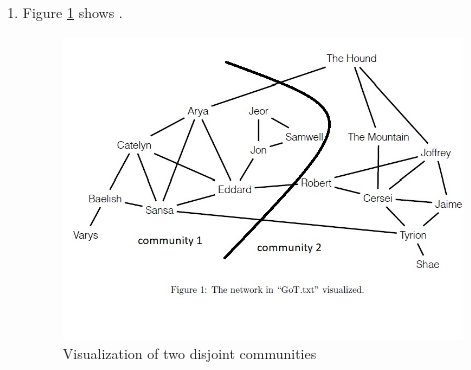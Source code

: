 \documentclass[10pt,a4paper]{article}
\begin{document}
\begin{enumerate}
\item Figure \ref{fig-1} shows .\\
\begin{figure}
\includegraphics[scale=1]{task2c).jpg}
\caption{Visualization of two disjoint communities}
\label{fig-1}
\end{figure}
\end{enumerate}
\end{document}

